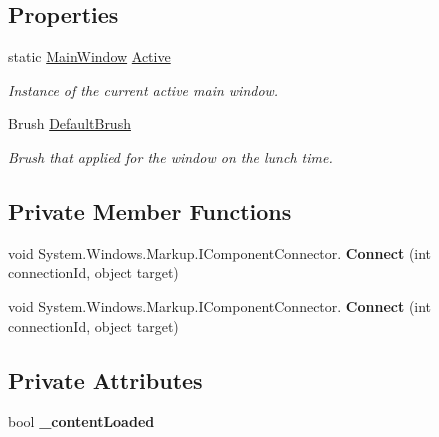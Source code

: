 \subsection*{Properties}
\begin{DoxyCompactItemize}
\item 
static \mbox{\hyperlink{class_example_panel_descriptor_1_1_main_window}{Main\+Window}} \mbox{\hyperlink{class_example_panel_descriptor_1_1_main_window_a82ef771c382f2dd1278d2e8190c3fe43}{Active}}
\begin{DoxyCompactList}\small\item\em Instance of the current active main window. \end{DoxyCompactList}\item 
Brush \mbox{\hyperlink{class_example_panel_descriptor_1_1_main_window_aae5508e66cf2fc08d9c4b4920d32e8c9}{Default\+Brush}}
\begin{DoxyCompactList}\small\item\em Brush that applied for the window on the lunch time. \end{DoxyCompactList}\end{DoxyCompactItemize}
\subsection*{Private Member Functions}
\begin{DoxyCompactItemize}
\item 
\mbox{\label{class_example_panel_descriptor_1_1_main_window_a897f373e2c57a3948638d2c3bbcf8dbd}} 
void System.\+Windows.\+Markup.\+I\+Component\+Connector. {\bfseries Connect} (int connection\+Id, object target)
\item 
\mbox{\label{class_example_panel_descriptor_1_1_main_window_a897f373e2c57a3948638d2c3bbcf8dbd}} 
void System.\+Windows.\+Markup.\+I\+Component\+Connector. {\bfseries Connect} (int connection\+Id, object target)
\end{DoxyCompactItemize}
\subsection*{Private Attributes}
\begin{DoxyCompactItemize}
\item 
\mbox{\label{class_example_panel_descriptor_1_1_main_window_a9db5d9ed74968327cb5e58cb4fd37840}} 
bool {\bfseries \+\_\+content\+Loaded}
\end{DoxyCompactItemize}


